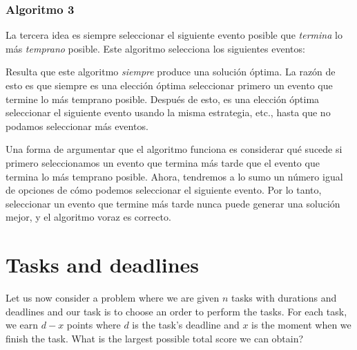 \subsubsection*{Algoritmo 3}

La tercera idea es siempre seleccionar el siguiente
evento posible que \emph{termina} lo más \emph{temprano} posible.
Este algoritmo selecciona los siguientes eventos:
\begin{center}
\end{center}

Resulta que este algoritmo
\emph{siempre} produce una solución óptima.
La razón de esto es que siempre es una elección óptima
seleccionar primero un evento que termine
lo más temprano posible.
Después de esto, es una elección óptima
seleccionar el siguiente evento
usando la misma estrategia, etc.,
hasta que no podamos seleccionar más eventos.

Una forma de argumentar que el algoritmo funciona
es considerar
qué sucede si primero seleccionamos un evento
que termina más tarde que el evento que termina
lo más temprano posible.
Ahora, tendremos a lo sumo un número igual de
opciones de cómo podemos seleccionar el siguiente evento.
Por lo tanto, seleccionar un evento que termine más tarde
nunca puede generar una solución mejor,
y el algoritmo voraz es correcto.

\section{Tasks and deadlines}

Let us now consider a problem where
we are given $n$ tasks with durations and deadlines
and our task is to choose an order to perform the tasks.
For each task, we earn $d-x$ points
where $d$ is the task's deadline
and $x$ is the moment when we finish the task.
What is the largest possible total score
we can obtain?

